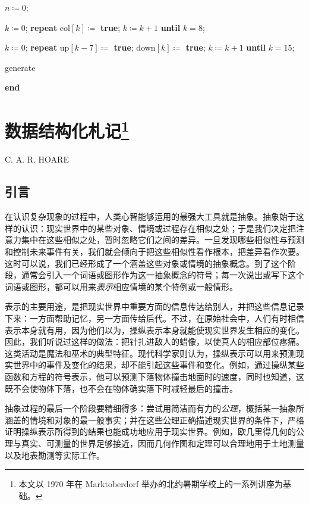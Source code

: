 \documentclass[twoside,11pt,fontset=none]{ctexbook}
\begin{document}
\noindent
\quad \quad $n \coloneq 0$;

\noindent
\quad \quad $k\coloneq 0$; \textbf{repeat} col$[k] \coloneq$ \textbf{true}; $k\coloneq k + 1$ \textbf{until} $k = 8$;

\noindent
\quad \quad $k\coloneq 0$; \textbf{repeat} up$[k-7] \coloneq$ \textbf{true}; down$[k] \coloneq$ \textbf{\textbf{true}}; $k\coloneq k + 1$ \textbf{until} $k=15$;

\noindent
\quad generate

\noindent
\textbf{end}
\chapter[数据结构化札记]{数据结构化札记\footnote{本文以 1970 年在 Marktoberdorf 举办的北约暑期学校上的一系列讲座为基础。}}

{
	\noindent
	\scshape\hfill\scriptsize C. A. R. HOARE\hfill
}
\renewcommand{\leftmark}{\normalfont\scriptsize\hfill C. A. R. HOARE\hfill}
\medskip

\section{引言}

在认识复杂现象的过程中，人类心智能够运用的最强大工具就是抽象。抽象始于这样的认识：现实世界中的某些对象、情境或过程存在相似之处；于是我们决定把注意力集中在这些相似之处，暂时忽略它们之间的差异。一旦发现哪些相似性与预测和控制未来事件有关，我们就会倾向于把这些相似性看作根本，把差异看作次要。这时可以说，我们已经形成了一个涵盖这些对象或情境的抽象概念。到了这个阶段，通常会引入一个词语或图形作为这一抽象概念的符号；每一次说出或写下这个词语或图形，都可以用来\textit{表示}相应情境的某个特例或一般情形。

表示的主要用途，是把现实世界中重要方面的信息传达给别人，并把这些信息记录下来：一方面帮助记忆，另一方面传给后代。不过，在原始社会中，人们有时相信表示本身就有用，因为他们以为，操纵表示本身就能使现实世界发生相应的变化。因此，我们听说过这样的做法：把针扎进敌人的蜡像，以使真人的相应部位疼痛。这类活动是魔法和巫术的典型特征。现代科学家则认为，操纵表示可以用来预测现实世界中的事件及变化的结果，却不能引起这些事件和变化。例如，通过操纵某些函数和方程的符号表示，他可以预测下落物体撞击地面时的速度，同时也知道，这既不会使物体下落，也不会在物体确实落下时减轻最后的撞击。

抽象过程的最后一个阶段要精细得多：尝试用简洁而有力的\textit{公理}，概括某一抽象所涵盖的情境和对象的最一般事实；并在这些公理正确描述现实世界的条件下，严格证明操纵表示所得到的结果也能成功地应用于现实世界。例如，欧几里得几何的公理与真实、可测量的世界足够接近，因而几何作图和定理可以合理地用于土地测量以及地表勘测等实际工作。
\end{document}
